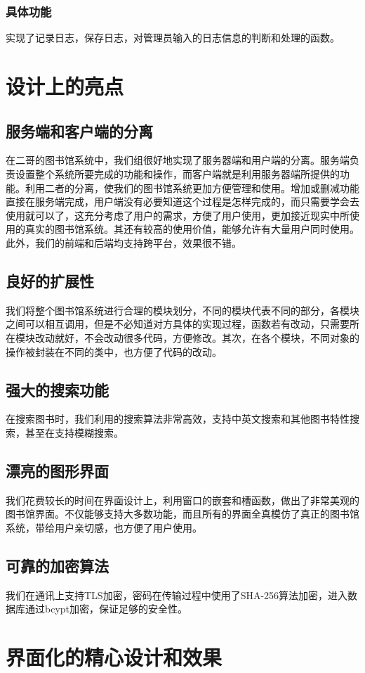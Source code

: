\documentclass[UTF8]{ctexart}
\begin{document}
\subsubsection{具体功能}
实现了记录日志，保存日志，对管理员输入的日志信息的判断和处理的函数。
\section{设计上的亮点}
\subsection{服务端和客户端的分离}
在二哥的图书馆系统中，我们组很好地实现了服务器端和用户端的分离。服务端负责设置整个系统所要完成的功能和操作，而客户端就是利用服务器端所提供的功能。利用二者的分离，使我们的图书馆系统更加方便管理和使用。增加或删减功能直接在服务端完成，用户端没有必要知道这个过程是怎样完成的，而只需要学会去使用就可以了，这充分考虑了用户的需求，方便了用户使用，更加接近现实中所使用的真实的图书馆系统。其还有较高的使用价值，能够允许有大量用户同时使用。此外，我们的前端和后端均支持跨平台，效果很不错。
\subsection{良好的扩展性}
我们将整个图书馆系统进行合理的模块划分，不同的模块代表不同的部分，各模块之间可以相互调用，但是不必知道对方具体的实现过程，函数若有改动，只需要所在模块改动就好，不会改动很多代码，方便修改。其次，在各个模块，不同对象的操作被封装在不同的类中，也方便了代码的改动。
\subsection{强大的搜索功能}
在搜索图书时，我们利用的搜索算法非常高效，支持中英文搜索和其他图书特性搜索，甚至在支持模糊搜索。
\subsection{漂亮的图形界面}
我们花费较长的时间在界面设计上，利用窗口的嵌套和槽函数，做出了非常美观的图书馆界面。不仅能够支持大多数功能，而且所有的界面全真模仿了真正的图书馆系统，带给用户亲切感，也方便了用户使用。
\subsection{可靠的加密算法}
我们在通讯上支持TLS加密，密码在传输过程中使用了SHA-256算法加密，进入数据库通过bcypt加密，保证足够的安全性。
\section{界面化的精心设计和效果}
\end{document}
